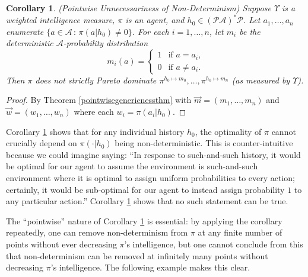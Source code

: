\documentclass[twoside]{article}
\newtheorem{corollary}[theorem]{Corollary}
\begin{document}
\begin{corollary}
\label{nondeterminismcorollary}
    (Pointwise Unnecessariness of Non-Determinism)
    Suppose $\Upsilon$ is a weighted intelligence measure, $\pi$ is an agent,
    and $h_0\in(\mathcal P\mathcal A)^*\mathcal P$.
    Let $a_1,\ldots,a_n$ enumerate $\{a\in\mathcal A\,:\,\pi(a|h_0)\not=0\}$.
    For each $i=1,\ldots,n$, let $m_i$ be the
    deterministic $\mathcal A$-probability distribution
    \[
        m_i(a) = \begin{cases}
            1 &\mbox{if $a=a_i$,}\\
            0 &\mbox{if $a\not=a_i$.}
        \end{cases}
    \]
    Then $\pi$ does not strictly Pareto dominate
    $\pi^{h_0\mapsto m_0},\ldots,\pi^{h_0\mapsto m_n}$
    (as measured by $\Upsilon$).
\end{corollary}

\begin{proof}
    By Theorem \ref{pointwisegenericnessthm} with
    $\vec m=(m_1,\ldots,m_n)$ and $\vec w=(w_1,\ldots,w_n)$ where each
    $w_i=\pi(a_i|h_0)$.
\end{proof}

Corollary \ref{nondeterminismcorollary} shows that for any individual
history $h_0$, the optimality of $\pi$ cannot crucially depend on $\pi(\cdot|h_0)$
being non-deterministic. This is counter-intuitive because we could imagine saying:
``In response to such-and-such history, it would be optimal for our agent
to assume the environment is such-and-such environment where it is optimal to
assign uniform probabilities to every action;
certainly, it would be sub-optimal for our agent to instead assign probability $1$ to
any particular action.'' Corollary \ref{nondeterminismcorollary} shows
that no such statement can be true.

The ``pointwise'' nature of Corollary \ref{nondeterminismcorollary}
is essential: by applying the corollary repeatedly, one can remove non-determinism
from $\pi$ at any finite number of points without ever decreasing $\pi$'s intelligence,
but one cannot conclude from this that non-determinism can be removed at infinitely
many points without decreasing $\pi$'s intelligence. The following example makes this
clear.
\end{document}
